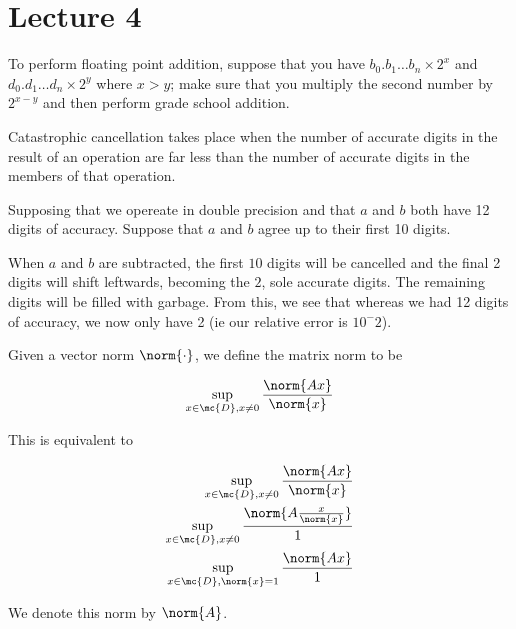 \documentclass[../main.tex]{subfiles}
\begin{document}
\section{Lecture 4}

\begin{example}
    To perform floating point addition, suppose that you have
    $b_0.b_1 \dots b_n \times 2^{x}$ and 
    $d_0.d_1 \dots d_n \times 2^{y}$ where $x > y$; make sure
    that you multiply the second number by $2^{x-y}$ and then perform grade school addition.
\end{example}

\begin{definition}
    Catastrophic cancellation takes place when the number of
    accurate digits in the result of an operation are far
    less than the number of accurate digits in the members
    of that operation.
\end{definition}

\begin{example}
    Supposing that we opereate in double precision and that
    $a$ and $b$ both have 12 digits of accuracy. Suppose
    that $a$ and $b$ agree up to their first 10 digits.

    When $a$ and $b$ are subtracted, the first $10$ digits
    will be cancelled and the final 2 digits will shift
    leftwards, becoming the $2$, sole accurate digits. The
    remaining digits will be filled with garbage. From this,
    we see that whereas we had 12 digits of accuracy, we now
    only have 2 (ie our relative error is $10^-2$).
\end{example}

\begin{definition}
    Given a vector norm $\norm{\cdot}$, we define the matrix norm to be

    \[
        \sup_{x \in \mc{D}, x \not = 0} \frac{\norm{Ax}}{\norm{x}}
    \]

    This is equivalent to

    \begin{align*}
        \sup_{x \in \mc{D}, x \not = 0} \frac{\norm{Ax}}{\norm{x}} \\
        \sup_{x \in \mc{D}, x \not = 0} \frac{\norm{A\frac{x}{\norm{x}}}}{1} \\
        \sup_{x \in \mc{D}, \norm{x} = 1} \frac{\norm{Ax}}{1} \\
    \end{align*}

    We denote this norm by $\norm{A}$.
\end{definition}
\end{document}
